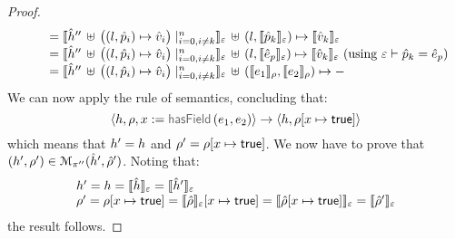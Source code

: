 \begin{proof}
$$\begin{array}{l}
    \qquad = \semexpr{\sheap'' \, \uplus \, \big((l, \sexprp_i) \mapsto \sexprv_i\big)\mid_{i = 0, i\neq k}^n}{\senv} \dunion (l, \semexpr{\sexprp_k}{\senv}) \mapsto \semexpr{\sexprv_k}{\senv} \\ 
     \qquad = \semexpr{\sheap'' \, \uplus \, \big((l, \sexprp_i) \mapsto \sexprv_i\big)\mid_{i = 0, i\neq k}^n}{\senv} \dunion (l, \semexpr{\sexpr_p}{\senv}) \mapsto \semexpr{\sexprv_k}{\senv}
      			\text{ (using $\senv \vdash \sexprp_k = \sexpr_p$)} \\ 
     \qquad = \semexpr{\sheap'' \, \uplus \, \big((l, \sexprp_i) \mapsto \sexprv_i\big)\mid_{i = 0, i\neq k}^n}{\senv} \dunion (\symbeval{\jsilexpr_1}{\store}, \symbeval{\jsilexpr_2}{\store}) \mapsto - \\
\end{array}
$$
We can now apply the  rule of \jsil semantics, concluding that:  
$$
   \semtrans{\heap, \store, \jvar := \hasfield(\jsilexpr_1, \jsilexpr_2)}{\heap,  \store[\jvar \mapsto \jtrue]}
$$
which means that $\heap' = \heap$ and $\store' = \store[\jvar \mapsto \jtrue]$. 
%
We now have to prove that $(\heap', \store') \in \smodels{\sheap', \sstore'}{\pc''}$.
Noting that:
$$
\begin{array}{l}
\heap' = \heap = \semexpr{\sheap}{\senv} = \semexpr{\sheap'}{\senv} \\
 \store' = \store[\jvar \mapsto \jtrue] = \symbeval{\sstore}{\senv}[\jvar \mapsto \jtrue]  = \symbeval{\sstore[\jvar \mapsto \jtrue]}{\senv} = \symbeval{\sstore'}{\senv} 
\end{array}
$$
the result follows. 
\vspace{6pt}



\end{proof}
